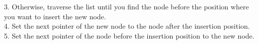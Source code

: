 \documentclass[preview]{standalone}
\begin{document}
3. Otherwise, traverse the list until you find the node before the position where you want to insert the new node.\\4. Set the next pointer of the new node to the node after the insertion position.\\5. Set the next pointer of the node before the insertion position to the new node.\\
\end{document}
